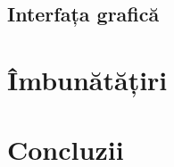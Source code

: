 \documentclass[a4paper]{article}
\begin{document}
\subsection{Interfața grafică}

\section{Îmbunătățiri}

\section{Concluzii}

\newpage
\printbibliography[title=\section{Bibliografie}]

\renewcommand\listoflistingscaption{\section{Listinguri de cod sursă}}
\listoflistings
\end{document}
